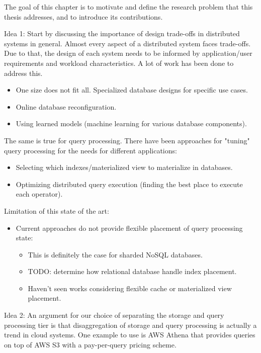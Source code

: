 The goal of this chapter is to motivate and define the research problem that
this thesis addresses, and to introduce its contributions.

Idea 1: Start by discussing the importance of design trade-offs in distributed
systems in general.
Almost every aspect of a distributed system faces trade-offs.
Due to that, the design of each system needs to be informed by application/user
requirements and workload characteristics.
A lot of work has been done to address this.
\begin{itemize}
  \item One size does not fit all. Specialized database designs for specific use
  cases.
  \item Online database reconfiguration.
  \item Using learned models (machine learning for various database components).
\end{itemize}

The same is true for query processing.
There have been approaches for "tuning" query processing for the needs for different applications:
\begin{itemize}
  \item Selecting which indexes/materialized view to materialize in databases.
  \item Optimizing distributed query execution (finding the best place to execute each operator).
\end{itemize}

Limitation of this state of the art:
\begin{itemize}
  \item Current approaches do not provide flexible placement of query processing state:
  \begin{itemize}
    \item This is definitely the case for sharded NoSQL databases.
    \item TODO: determine how relational database handle index placement.
    \item Haven't seen works considering flexible cache or materialized view placement.
  \end{itemize}
\end{itemize}

Idea 2: An argument for our choice of separating the storage and query processing tier is that disaggregation of storage
and query processing is actually a trend in cloud systems.
One example to use is AWS Athena that provides queries on top of AWS S3 with a pay-per-query pricing scheme.


